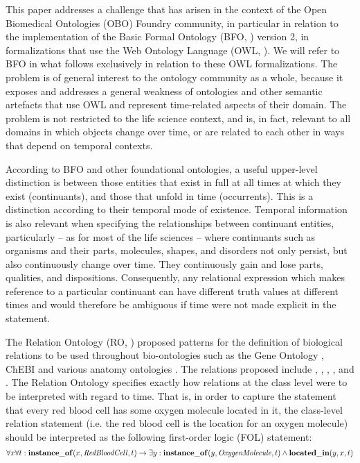 


This paper addresses a challenge that has arisen in the context of the Open Biomedical Ontologies (OBO) Foundry \cite{Smith2007} community, in particular in relation to the implementation of the Basic Formal Ontology (BFO, \cite{BFO2:Graz}) version 2, in formalizations that use the Web Ontology Language (OWL, \cite{grau2008}). 
We will refer to BFO in what follows exclusively in relation to these OWL formalizations. 
The problem is of general interest to the %
ontology 
community as a whole, because it exposes and addresses a general weakness 
of ontologies and other semantic artefacts that
use OWL and represent time-related
aspects of their domain. 
The problem is not restricted to the life science context, and is, in fact, relevant to all domains in which objects change over time, or are related to each other in ways that depend on temporal contexts.   

According to BFO and other foundational ontologies, a useful upper-level 
distinction is between those entities that exist in full at all times at which they exist (continuants), 
and those that unfold in time (occurrents). This is a distinction according to their 
temporal mode of existence. Temporal information is also relevant when specifying the relationships between continuant entities, particularly -- as for most of the life sciences -- where continuants such as organisms and their parts, molecules, shapes, and disorders not only persist, but also continuously change over time. They continuously gain and lose parts, qualities, and dispositions. Consequently, any relational expression which makes reference to a particular continuant can have different truth values at different times and would therefore be ambiguous if time were not made explicit in the statement. 

The Relation Ontology (RO, \cite{OBO:RO}) proposed patterns for the definition of biological relations to be used throughout bio-ontologies such as the Gene Ontology \cite{go2000}, ChEBI \cite{chebinar2013} and various anatomy ontologies \cite{uberon2012}. The relations proposed include 
, , , , and  . 
The Relation Ontology specifies exactly how relations at the class level were to be interpreted with regard to time. That is, in order to capture the statement that every red blood cell has some oxygen molecule located in it, the class-level relation statement    (i.e. the red blood cell is the location for an oxygen molecule) should be interpreted as the following first-order logic (FOL) statement: 
\begin{equation}
\forall x \forall t : \mathrm{\mathbf{instance\_of}}(x, \mathit{RedBloodCell}, t) \rightarrow 
\exists y : \mathrm{\mathbf{instance\_of}}(y, \mathit{OxygenMolecule}, t) \wedge \mathrm{\mathbf{located\_in}}(y, x, t)
\end{equation}

